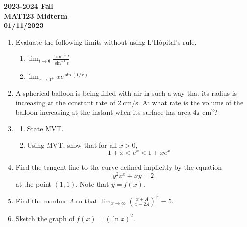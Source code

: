 \documentclass[a4paper, 12pt]{article}
\renewcommand{\headrulewidth}{0pt}
\begin{document}
\pagestyle{empty}

\begin{center}
\textbf{2023-2024 Fall\\MAT123 Midterm\\01/11/2023}
\end{center}

\begin{enumerate}[leftmargin=*,label=\textbf{\arabic*.}]
\item Evaluate the following limits without using L'Hôpital's rule.
\begin{enumerate}[leftmargin=*,label=\textbf{\alph*.}]
\item $\displaystyle \lim_{t\to 0} \frac{\tan^{-1} t}{\sin^{-1} t}$
\item $\displaystyle \lim_{x\to 0^+} x e^{\displaystyle \sin(1/x)}$
\end{enumerate}

\item A spherical balloon is being filled with air in such a way that its radius is increasing at the constant rate of 2 cm/s. At what rate is the volume of the balloon increasing at the instant when its surface has area $4\pi$ cm$^2$?

\item
\begin{enumerate}[leftmargin=*,label=\textbf{\alph*.}]
\item State MVT.
\item Using MVT, show that for all $x>0$,
\[1+x< e^x<1+x e^x\]
\end{enumerate}

\item Find the tangent line to the curve defined implicitly by the equation
\[y^2x^x+xy=2\]
at the point $(1,1)$. Note that $y=f(x)$.

\item Find the number $A$ so that $\displaystyle\lim_{x\to\infty}\left(\frac{x+A}{x-2A}\right)^{x}=5$.

\item Sketch the graph of $f(x)=(\ln x)^2$.

\end{enumerate}

\newpage
\pagestyle{fancy}
\renewcommand{\headrulewidth}{1pt}

\end{document}
